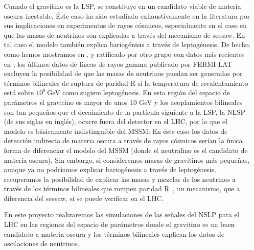 Cuando el gravitino es la LSP, se constituye en un candidato viable de
materia oscura inestable. Éste caso ha sido estudiado exhaustivamente
en la literatura por sus implicaciones en experimentos de rayos
cósmicos, especialmente en el caso en que las masas de neutrinos son
explicadas a través del mecanismo de seesaw. En tal caso el modelo
también explica bariogénisis a través de leptogénesis. De hecho, como
hemos mostramos en \cite{Choi:2010jt}, y ratificado por otro grupo con
datos más recientes en \cite{Garny:2010eg}, los últimos datos de
líneas de rayos gamma publicado por FERMI-LAT excluyen la posibilidad
de que las masas de neutrinos puedan ser generadas por términos
bilineales de ruptura de paridad R si la temperatura de
recalentamiento está sobre $10^9\ $GeV como sugiere leptogénesis. En
esta región del espacio de parámetros el gravitino es mayor de unos 10
GeV y los acoplamientos bilineales son tan pequeños que el decaimiento
de la partícula siguiente a la LSP, la NLSP (de sus siglas en inglés),
ocurre fuera del detector en el LHC, por lo que el modelo es
básicamente indistinguible del MSSM. En éste caso los datos de
detección indirecta de materia oscura a través de rayos cósmicos
serían la única forma de diferenciar el modelo del MSSM (donde el
neutralino es el candidato de materia oscura). Sin embargo, si
consideremos masas de gravitinos más pequeñas, aunque ya no podríamos
explicar bariogénesis a través de leptogénesis, recuperamos la
posibilidad de explicar las masas y mezclas de los neutrinos a través de
los términos bilineales que rompen paridad R~\cite{Hirsch:2005ag}, un
mecanismo, que a diferencia del seesaw, si se puede verificar en el
LHC.

\begin{proyecto}
  En este proyecto realizaremos las simulaciones de las señales del
  NSLP para el LHC  en las regiones del
  espacio de parámetros donde el gravitino es un buen candidato a
  materia oscura y los términos bilineales explican los datos de
  oscilaciones de neutrinos. 
\end{proyecto}


